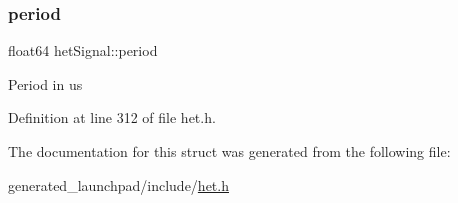 \subsubsection{\texorpdfstring{period}{period}}
{\footnotesize\ttfamily float64 het\+Signal\+::period}

Period in us 

Definition at line 312 of file het.\+h.



The documentation for this struct was generated from the following file\+:\begin{DoxyCompactItemize}
\item 
generated\+\_\+launchpad/include/\mbox{\hyperlink{het_8h}{het.\+h}}\end{DoxyCompactItemize}

